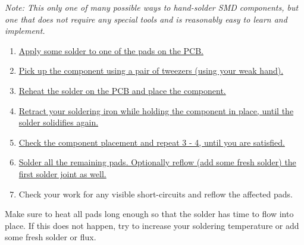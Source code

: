 \documentclass[12pt, a4paper]{article}
\begin{document}
\textit{Note: This only one of many possible ways to hand-solder SMD components, but one that
does not require any special tools and is reasonably easy to learn and implement.}

\begin{enumerate}
    \item \hyperref[fig:step1-3]{Apply some solder to one of the pads on the PCB.}
    \item \hyperref[fig:step1-3]{Pick up the component using a pair of tweezers
          (using your weak hand).}
    \item \hyperref[fig:step1-3]{Reheat the solder on the PCB and place the component.}
    \item \hyperref[fig:step4-6]{Retract your soldering iron while holding the component in
          place, until the solder solidifies again.}
    \item \hyperref[fig:step4-6]{Check the component placement and repeat 3 - 4, until you are
          satisfied.}
    \item \hyperref[fig:step4-6]{Solder all the remaining pads. Optionally reflow
          (add some fresh solder) the first solder joint as well.}
    \item Check your work for any visible short-circuits and reflow the affected pads.
\end{enumerate}

Make sure to heat all pads long enough so that the solder has time to flow into place. If this
does not happen, try to increase your soldering temperature or add some fresh solder or flux.
\end{document}
